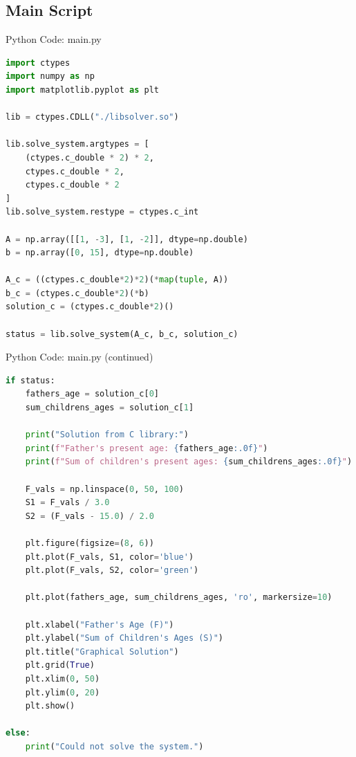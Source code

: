 \documentclass{beamer}
\numberwithin{equation}{section}
\theoremstyle{remark}
\begin{document}
\subsection{Main Script}
\begin{frame}[fragile]{Python Code: main.py}
\begin{lstlisting}[language=Python]
import ctypes
import numpy as np
import matplotlib.pyplot as plt

lib = ctypes.CDLL("./libsolver.so")

lib.solve_system.argtypes = [
    (ctypes.c_double * 2) * 2,
    ctypes.c_double * 2,
    ctypes.c_double * 2
]
lib.solve_system.restype = ctypes.c_int

A = np.array([[1, -3], [1, -2]], dtype=np.double)
b = np.array([0, 15], dtype=np.double)

A_c = ((ctypes.c_double*2)*2)(*map(tuple, A))
b_c = (ctypes.c_double*2)(*b)
solution_c = (ctypes.c_double*2)()

status = lib.solve_system(A_c, b_c, solution_c)
\end{lstlisting}
\end{frame}

\begin{frame}[fragile]{Python Code: main.py (continued)}
\begin{lstlisting}[language=Python]
if status:
    fathers_age = solution_c[0]
    sum_childrens_ages = solution_c[1]
    
    print("Solution from C library:")
    print(f"Father's present age: {fathers_age:.0f}")
    print(f"Sum of children's present ages: {sum_childrens_ages:.0f}")
    
    F_vals = np.linspace(0, 50, 100)
    S1 = F_vals / 3.0
    S2 = (F_vals - 15.0) / 2.0
    
    plt.figure(figsize=(8, 6))
    plt.plot(F_vals, S1, color='blue')
    plt.plot(F_vals, S2, color='green')
    
    plt.plot(fathers_age, sum_childrens_ages, 'ro', markersize=10)
    
    plt.xlabel("Father's Age (F)")
    plt.ylabel("Sum of Children's Ages (S)")
    plt.title("Graphical Solution")
    plt.grid(True)
    plt.xlim(0, 50)
    plt.ylim(0, 20)
    plt.show()

else:
    print("Could not solve the system.")
\end{lstlisting}
\end{frame}
\end{document}
